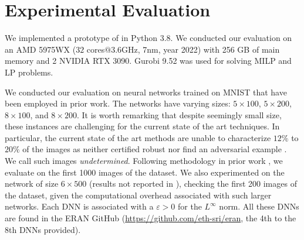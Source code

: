 \newpage

\section{Experimental Evaluation}


We implemented a prototype of \toolname in Python 3.8. 
We conducted our evaluation on an AMD 5975WX  ($32$ cores$@3.6$GHz, 7nm, year 2022) 
with 256 GB of main memory and 2 NVIDIA RTX 3090. 
Gurobi 9.52 was used for solving MILP and LP problems. 

We conducted our evaluation on neural networks trained on MNIST that have been employed in prior work. The networks have varying sizes: $5\times 100$, $5\times 200$, $8 \times 100$, and $8 \times 200$. It is worth remarking that despite seemingly small size, these instances are challenging for the current state of the art techniques. In particular, the current state of the art methods are unable to characterize $12\%$ to $20\%$ of the images as neither certified robust \cite{crown} nor find an adversarial example \cite{attack}. We call such images {\em undetermined}. Following methodology in prior work \cite{prima,crown}, we evaluate on the first 1000 images of the dataset. We also experimented on the network of size $6\times 500$ (results not reported in \cite{prima,crown}), checking the first 200 images of the dataset, given the computational overhead associated with such larger networks. 
Each DNN is associated with a $\varepsilon>0$ for the $L^\infty$ norm.
All these DNNs are found in the ERAN GitHub 
(\url{https://github.com/eth-sri/eran}, the 4th to the 8th DNNs provided).

